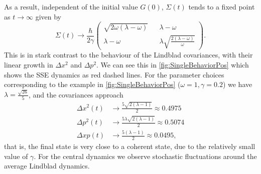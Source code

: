\documentclass[12pt]{iopart} %
\begin{document}
As a result, independent of the initial value $G(0)$, $\Sigma(t)$ tends to a fixed point as $t\to\infty$ given by
\begin{equation} \label{eq:GFixedLind}
    \Sigma(t)\to\frac{\hbar}{2 \gamma}\begin{pmatrix}
    \sqrt{2 \omega  (\lambda-\omega )}
    &&\lambda-\omega \\
 \lambda-\omega&& \lambda\sqrt{\frac{2 (\lambda-\omega)}{\omega}}
    \end{pmatrix}.
\end{equation}
This is in stark contrast to the behaviour of the Lindblad covariances, with their linear growth in $\Delta x^2$ and $\Delta p^2$. We can see this in \cref{fig:SingleBehaviorPos} which shows the SSE dynamics as red dashed lines. For the parameter choices corresponding to the example in \cref{fig:SingleBehaviorPos} ($\omega=1,\gamma=0.2$) we have $\lambda=\frac{\sqrt{26}}{5}$, and the covariances approach
\begin{equation}
\begin{aligned}
    \Delta x^2(t)&\to \frac{5\sqrt{2(\lambda-1)}}{2}\approx 0.4975\\
  \Delta p^2(t)&\to\frac{5\lambda\sqrt{2(\lambda-1)}}{2}\approx0.5074\\
    \Delta xp(t)&\to\frac{5(\lambda-1)}{2}\approx 0.0495,
            \end{aligned}
\end{equation}
that is, the final state is very close to a coherent state, due to the relatively small value of $\gamma$.
For the central dynamics we observe stochastic fluctuations around the average Lindblad dynamics. 
\end{document}
